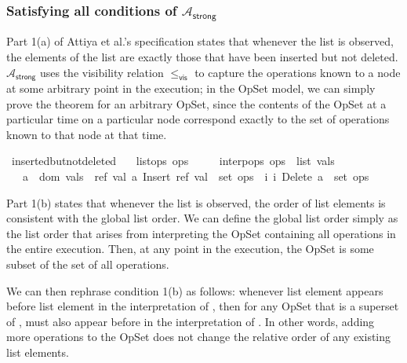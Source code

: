 \subsubsection{Satisfying all conditions of $\mathcal{A}_\textsf{strong}$}

Part 1(a) of Attiya et al.'s specification states that whenever the list is observed, the elements of the list are exactly those that have been inserted but not deleted.
$\mathcal{A}_\textsf{strong}$ uses the visibility relation $\le_\textsf{vis}$ to capture the operations known to a node at some arbitrary point in the execution; in the OpSet model, we can simply prove the theorem for an arbitrary OpSet, since the contents of the OpSet at a particular time on a particular node correspond exactly to the set of operations known to that node at that time.

\begin{isabelle}
\isamarkupfalse%
\ inserted{\isacharunderscore}but{\isacharunderscore}not{\isacharunderscore}deleted{\isacharcolon}\isanewline
\ \ \ {\isachardoublequoteopen}list{\isacharunderscore}ops\ ops{\isachardoublequoteclose}\isanewline
\ \ \ \ \ {\isachardoublequoteopen}interp{\isacharunderscore}ops\ ops\ {\isacharequal}\ {\isacharparenleft}list{\isacharcomma}\ vals{\isacharparenright}{\isachardoublequoteclose}\isanewline
\ \ \ {\isachardoublequoteopen}a\ {\isasymin}\ dom\ {\isacharparenleft}vals{\isacharparenright}\ {\isasymlongleftrightarrow}\ {\isacharparenleft}{\isasymexists}ref\ val{\isachardot}\ {\isacharparenleft}a{\isacharcomma}\ Insert\ ref\ val{\isacharparenright}\ {\isasymin}\ set\ ops{\isacharparenright}\ {\isasymand}\ {\isacharparenleft}{\isasymnexists}i{\isachardot}\ {\isacharparenleft}i{\isacharcomma}\ Delete\ a{\isacharparenright}\ {\isasymin}\ set\ ops{\isacharparenright}{\isachardoublequoteclose}
\end{isabelle}

Part 1(b) states that whenever the list is observed, the order of list elements is consistent with the global list order.
We can define the global list order simply as the list order that arises from interpreting the OpSet containing all operations in the entire execution.
Then, at any point in the execution, the OpSet is some subset of the set of all operations.

We can then rephrase condition 1(b) as follows: whenever list element  appears before list element  in the interpretation of , then for any OpSet  that is a superset of ,  must also appear before  in the interpretation of .
In other words, adding more operations to the OpSet does not change the relative order of any existing list elements.

